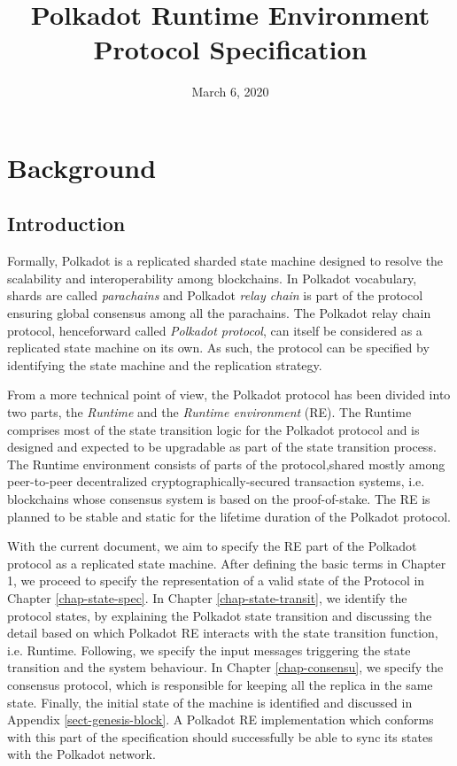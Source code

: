 \documentclass{book}
\newcommand{\tmem}[1]{{\em #1\/}}
\newcommand{\tmtextit}[1]{{\itshape{#1}}}
\providecommand{\tmem}[1]{\tmtextit{#1}}
\providecommand{\tmtextit}[1]{\tmtextit{#1}}
\begin{document}
\title{
  Polkadot Runtime Environment\\
  {\Large Protocol Specification}
}

\date{March 6, 2020}

\maketitle

{\tableofcontents}

\chapter{Background}

\section{Introduction}

Formally, Polkadot is a replicated sharded state machine designed to resolve
the scalability and interoperability among blockchains. In Polkadot
vocabulary, shards are called {\tmem{parachains}} and Polkadot {\tmem{relay
chain}} is part of the protocol ensuring global consensus among all the
parachains. The Polkadot relay chain protocol, henceforward called
{\tmem{Polkadot protocol}}, can itself be considered as a replicated state
machine on its own. As such, the protocol can be specified by identifying the
state machine and the replication strategy.

From a more technical point of view, the Polkadot protocol has been divided
into two parts, the {\tmem{Runtime}} and the {\tmem{Runtime environment}}
(RE). The Runtime comprises most of the state transition logic for the
Polkadot protocol and is designed and expected to be upgradable as part of the
state transition process. The Runtime environment consists of parts of the
protocol,\quad shared mostly among peer-to-peer decentralized
cryptographically-secured transaction systems, i.e. blockchains whose
consensus system is based on the proof-of-stake. The RE is planned to be
stable and static for the lifetime duration of the Polkadot protocol.

With the current document, we aim to specify the RE part of the Polkadot
protocol as a replicated state machine. After defining the basic terms in
Chapter 1, we proceed to specify the representation of a valid state of the
Protocol in Chapter \ref{chap-state-spec}. In Chapter
\ref{chap-state-transit}, we identify the protocol states, by explaining the
Polkadot state transition and discussing the detail based on which Polkadot RE
interacts with the state transition function, i.e. Runtime. Following, we
specify the input messages triggering the state transition and the system
behaviour. In Chapter \ref{chap-consensu}, we specify the consensus protocol,
which is responsible for keeping all the replica in the same state. Finally,
the initial state of the machine is identified and discussed in Appendix
\ref{sect-genesis-block}. A Polkadot RE implementation which conforms with
this part of the specification should successfully be able to sync its states
with the Polkadot network.
\end{document}
